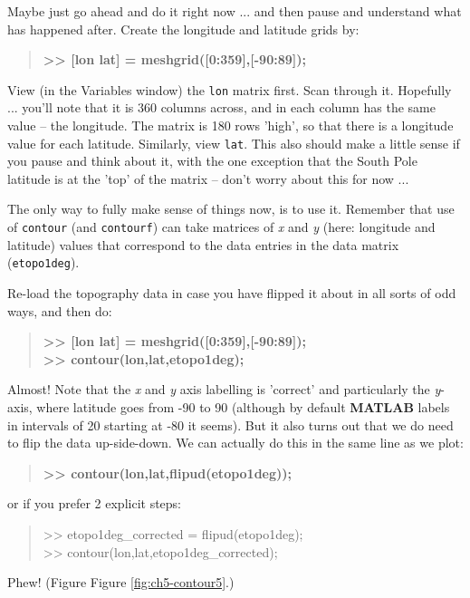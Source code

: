 \documentclass{tufte-book} %
\newenvironment{docspec}{\begin{quotation}\ttfamily\parskip0pt\parindent0pt\ignorespaces}{\end{quotation}}
\newenvironment{docspecbold}{\begin{quotation}\ttfamily\bfseries\parskip0pt\parindent0pt\ignorespaces}{\end{quotation}}
\begin{document}
Maybe just go ahead and do it right now ... and then pause and understand what has happened after. Create the longitude and latitude grids by:
\begin{docspecbold}
>> [lon lat] = meshgrid([0:359],[-90:89]);
\end{docspecbold}

View (in the \textsf{Variables window}) the \texttt{lon} matrix first. Scan through it. Hopefully ... you'll note that it is 360 columns across, and in each column has the same value -- the longitude. The matrix is 180 rows 'high', so that there is a longitude value for each latitude. Similarly, view \texttt{lat}. This also should make a little sense if you pause and think about it, with the one exception that the South Pole latitude is at the 'top' of the matrix -- don't worry about this for now ... 

The only way to fully make sense of things now, is to use it. Remember that use of \texttt{contour} (and \texttt{contourf}) can take matrices of \textit{x} and \textit{y} (here: longitude and latitude) values that correspond to the data entries in the data matrix (\texttt{etopo1deg}). 

Re-load the topography data in case you have flipped it about in all sorts of odd ways, and then do:
\begin{docspecbold}
>> [lon lat] = meshgrid([0:359],[-90:89]);
\\ >> contour(lon,lat,etopo1deg);
\end{docspecbold}
Almost! Note that the \textit{x} and \textit{y} axis labelling is 'correct' and particularly the \textit{y}-axis, where latitude goes from -90 to 90 (although by default \textbf{MATLAB} labels in intervals of 20 starting at -80 it seems). But it also turns out that we do need to flip the data up-side-down. We can actually do this in the same line as we plot:
\begin{docspecbold}
>> contour(lon,lat,flipud(etopo1deg));
\end{docspecbold}
or if you prefer 2 explicit steps:
\begin{docspec}
>> etopo1deg\_corrected = flipud(etopo1deg);\\
>> contour(lon,lat,etopo1deg\_corrected);
\end{docspec}

Phew! (Figure Figure \ref{fig:ch5-contour5}.)
\end{document}
